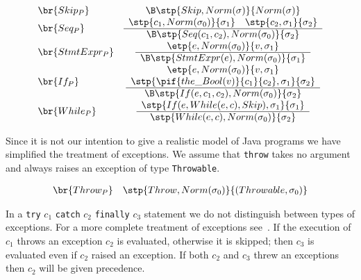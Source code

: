 \begin{displaymath}
\begin{array}{lc}
\br{Skip_P}     & \B\stp{ Skip, Norm(\sigma)}{Norm(\sigma)} \\

\br{Seq_P}      & 
\begin{array}{c}
\stp{c_1, Norm(\sigma_0)}{\sigma_1} \quad \stp{c_2, \sigma_1}{\sigma_2}\\
\hline
\B\stp{Seq(c_1, c_2), Norm(\sigma_0)}{\sigma_2}
\end{array}\\

\br{StmtExpr_P} &
\begin{array}{c}
\etp{e, Norm(\sigma_0)}{v,\sigma_1}\\
\hline
\B\stp{StmtExpr(e), Norm(\sigma_0)}{\sigma_1}
\end{array}\\

\br{If_P} &
\begin{array}{c}
\etp{e, Norm(\sigma_0)}{v,\sigma_1}\\
\stp{\pif{the\_Bool(v)}{c_1}{c_2}, \sigma_1}{\sigma_2}\\
\hline
\B \stp{If(e,c_1,c_2), Norm(\sigma_0)}{\sigma_2}
\end{array}\\

\br{While_P} &
\begin{array}{c}
\stp{If(e, While(e,c), Skip), \sigma_1}{\sigma_1}\\
\hline
\stp{While(e,c), Norm(\sigma_0)}{\sigma_2}
\end{array}\\

\end{array}
\end{displaymath}

Since it is not our intention to give a realistic model of Java programs we have simplified the treatment of
exceptions. We assume that \texttt{throw} takes no argument and always raises an exception of type
\texttt{Throwable}.

\begin{displaymath}
\begin{array}{lc}
\br{Throw_P}     &
\stp{Throw, Norm(\sigma_0)}{(Throwable, \sigma_0)}
\end{array}
\end{displaymath}

In a \texttt{try} $c_1$ \texttt{catch} $c_2$ \texttt{finally} $c_3$ statement we do not distinguish between
types of exceptions. For a more complete treatment of exceptions see~\cite{Oheimb-Nipkow-Java-LNCS}. If
the execution of $c_1$ throws an exception $c_2$ is evaluated, otherwise it is skipped; then $c_3$ is
evaluated even if $c_2$ raised an exception. If both $c_2$ and $c_3$ threw an exceptions then $c_2$ will be
given precedence.

